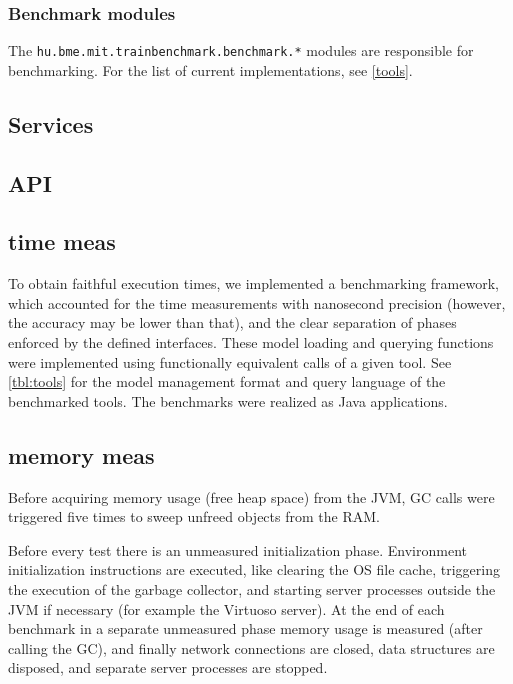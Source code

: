 \subsubsection{Benchmark modules}

The \texttt{hu.bme.mit.trainbenchmark.benchmark.*} modules are responsible for benchmarking. For the list of current implementations, see \ref{tools}.


\subsection{Services}

\subsection{API}

\subsection{time meas}

To obtain faithful execution times, we implemented a benchmarking framework,
which accounted for the time measurements with nanosecond precision (however, the accuracy may be lower than that),
 and the clear separation of phases enforced by the defined
interfaces. These model loading and querying functions were implemented using
functionally equivalent calls of a given tool. See \autoref{tbl:tools} for
the model management format and query language of the benchmarked tools. The
benchmarks were realized as Java applications.

\subsection{memory meas}
Before acquiring memory usage (free heap space) from the JVM, GC calls were triggered five times to sweep unfreed objects from the RAM.

Before every test
there is an unmeasured initialization phase. Environment initialization
instructions are executed, like clearing the OS file cache, triggering the
execution of the garbage collector, and starting server processes outside the
JVM if necessary (for example the Virtuoso server). At the end of each benchmark
in a separate unmeasured phase memory usage is measured (after calling the GC),
and finally network connections are closed, data structures are disposed, and
separate server processes are stopped.


